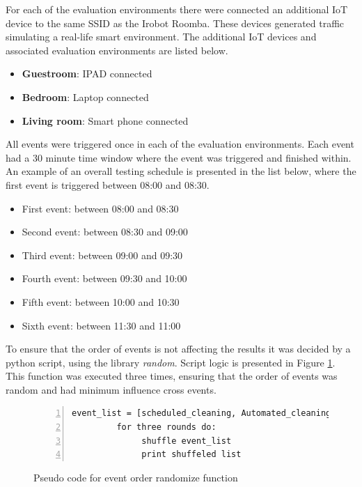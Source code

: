 For each of the evaluation environments there were connected an additional \gls{IoT} device to the same \gls{SSID} as the Irobot Roomba. These devices generated traffic simulating a real-life smart environment. The additional \gls{IoT} devices and associated evaluation environments are listed below.

\begin{itemize}
    \item \textbf{Guestroom}: IPAD connected
    \item \textbf{Bedroom}: Laptop connected
    \item \textbf{Living room}: Smart phone connected
\end{itemize}

All events were triggered once in each of the evaluation environments. Each event had a 30 minute time window where the event was triggered and finished within. An example of an overall testing schedule is presented in the list below, where the first event is triggered between 08:00 and 08:30. 

\begin{itemize}
    \item First event: between 08:00 and 08:30
    \item Second event: between 08:30 and 09:00
    \item Third event: between 09:00 and 09:30
    \item Fourth event: between 09:30 and 10:00
    \item Fifth event: between 10:00 and 10:30
    \item Sixth event: between 11:30 and 11:00
\end{itemize}

To ensure that the order of events is not affecting the results it was decided by a python script, using the library \textit{random}. Script logic is presented in Figure \ref{fig:Sudo_code_for_event_order_randomize}. This function was executed three times, ensuring that the order of events was random and had minimum influence cross events.

\begin{figure}[H]
    \centering
    \caption{Pseudo code for event order randomize function}
    \label{fig:Sudo_code_for_event_order_randomize}
    \begin{lstlisting}[numbers=left]
         event_list = [scheduled_cleaning, Automated_cleaning, Application_triggered_cleaning, Application_start, Physical_triggered_cleaning, Bin_remove]
         for three rounds do:
              shuffle event_list
              print shuffeled list
    \end{lstlisting}
\end{figure}

